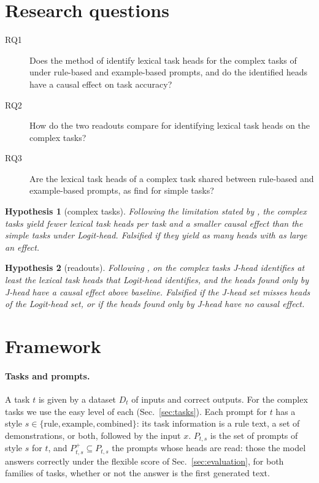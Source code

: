 \documentclass[11pt,a4paper]{article}
\newtheorem{hypothesis}{Hypothesis}
\begin{document}
\section{Research questions}\label{sec:rq}
\begin{description}
\item[RQ1] Does the method of \citet{yang2026shared} identify lexical task heads for the complex tasks of \citet{fu2026rules} under rule-based and example-based prompts, and do the identified heads have a causal effect on task accuracy?
\item[RQ2] How do the two readouts compare for identifying lexical task heads on the complex tasks?
\item[RQ3] Are the lexical task heads of a complex task shared between rule-based and example-based prompts, as \citet{yang2026shared} find for simple tasks?
\end{description}

\begin{hypothesis}[complex tasks]\label{h:complex}
Following the limitation stated by \citet[Sec.~4]{yang2026shared}, the complex tasks yield fewer lexical task heads per task and a smaller causal effect than the simple tasks under Logit-head. \emph{Falsified} if they yield as many heads with as large an effect.
\end{hypothesis}

\begin{hypothesis}[readouts]\label{h:readout}
Following \citet{merlo2026headjlens}, on the complex tasks J-head identifies at least the lexical task heads that Logit-head identifies, and the heads found only by J-head have a causal effect above baseline. \emph{Falsified} if the J-head set misses heads of the Logit-head set, or if the heads found only by J-head have no causal effect.
\end{hypothesis}


\section{Framework}\label{sec:framework}
\paragraph{Tasks and prompts.} A task $t$ is given by a dataset $D_t$ of inputs and correct outputs. For the complex tasks we use the easy level of each (Sec.~\ref{sec:tasks}). Each prompt for $t$ has a style $s\in\{\text{rule},\text{example},\text{combined}\}$: its task information is a rule text, a set of demonstrations, or both, followed by the input $x$. $P_{t,s}$ is the set of prompts of style $s$ for $t$, and $P^{+}_{t,s}\subseteq P_{t,s}$ the prompts whose heads are read: those the model answers correctly under the flexible score of Sec.~\ref{sec:evaluation}, for both families of tasks, whether or not the answer is the first generated text.
\end{document}
